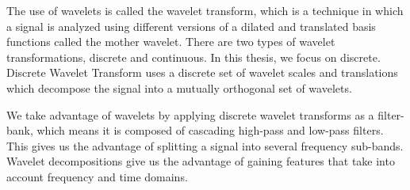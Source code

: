 \documentclass{turabian-thesis}
\begin{document}
The use of wavelets is called the wavelet transform, which is a technique in which a signal is analyzed using different versions of a dilated and translated basis functions called the mother wavelet. There are two types of wavelet transformations, discrete and continuous. In this thesis, we focus on discrete. Discrete Wavelet Transform uses a discrete set of wavelet scales and translations which decompose the signal into a mutually orthogonal set of wavelets. 

We take advantage of wavelets by applying discrete wavelet transforms as a filter-bank, which means it is composed of cascading high-pass and low-pass filters. This gives us the advantage of splitting a signal into several frequency sub-bands. Wavelet decompositions give us the advantage of gaining features that take into account frequency and time domains. 














\end{document}
